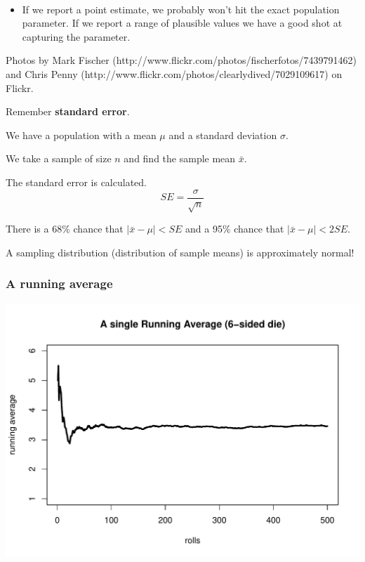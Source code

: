 \begin{frame}[shrink]
\begin{itemize}
\begin{columns}[c]
\end{columns}
$\:$ \\
\item If we report a point estimate, we probably won't hit the exact population parameter. If we report a range of plausible values we have a good shot at capturing the parameter. 

\end{itemize}

{\tiny Photos by Mark Fischer (http://www.flickr.com/photos/fischerfotos/7439791462) and Chris Penny (http://www.flickr.com/photos/clearlydived/7029109617) on Flickr.}


\end{frame}








\begin{frame}

Remember {\bf standard error}. \pause 

We have a population with a mean $\mu$ and a standard deviation $\sigma$. \pause

We take a sample of size $n$ and find the sample mean $\bar{x}$. \pause

The standard error is calculated. $$SE = \frac{\sigma}{\sqrt{n}}$$ \pause

There is a 68\% chance that $|\bar{x}-\mu| < SE$ and a 95\% chance that $|\bar{x}-\mu| < 2SE$.
\pause

A sampling distribution (distribution of sample means) is approximately normal! 
\end{frame}




\begin{frame}
\frametitle{A running average}
\includegraphics[scale=0.655]{4-2_conf_int/figures/run/running_die.pdf}
\end{frame}


